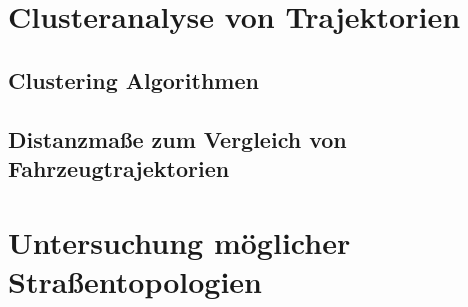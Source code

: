 
\section{Clusteranalyse von Trajektorien}
\label{sec:tra_clustering}

\subsection{Clustering Algorithmen}
\label{sec:cluster_algos}

\subsection{Distanzmaße zum Vergleich von Fahrzeugtrajektorien}
\label{sec:distance_measures}

\section{Untersuchung möglicher Straßentopologien}
\label{sec:street_topologies}
